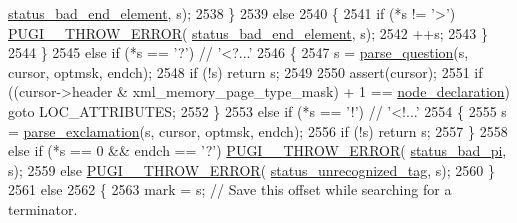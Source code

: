 \begin{DoxyCode}
      \hyperlink{namespacepugi_a9054ca609e12afb8f3e5892fc6c0b555a261cbf22c7da45388bcc1e6759020790}{status\_bad\_end\_element}, s);
2538                         \}
2539                         \textcolor{keywordflow}{else}
2540                         \{
2541                             \textcolor{keywordflow}{if} (*s != \textcolor{charliteral}{'>'}) \hyperlink{pugixml_8cpp_a8af02d87a10272f03f96ab93a96d7202}{PUGI\_\_THROW\_ERROR}(
      \hyperlink{namespacepugi_a9054ca609e12afb8f3e5892fc6c0b555a261cbf22c7da45388bcc1e6759020790}{status\_bad\_end\_element}, s);
2542                             ++s;
2543                         \}
2544                     \}
2545                     \textcolor{keywordflow}{else} \textcolor{keywordflow}{if} (*s == \textcolor{charliteral}{'?'}) \textcolor{comment}{// '<?...'}
2546                     \{
2547                         s = \hyperlink{structxml__parser_a2b0edc4fbf2ff448b4d5b31593c5c4fd}{parse\_question}(s, cursor, optmsk, endch);
2548                         \textcolor{keywordflow}{if} (!s) \textcolor{keywordflow}{return} s;
2549 
2550                         assert(cursor);
2551                         \textcolor{keywordflow}{if} ((cursor->header & xml\_memory\_page\_type\_mask) + 1 == 
      \hyperlink{namespacepugi_a137e94a038e4ab0ada6477cf7f6153a9aad8024cc4a4afbc68c871f3826a00616}{node\_declaration}) \textcolor{keywordflow}{goto} LOC\_ATTRIBUTES;
2552                     \}
2553                     \textcolor{keywordflow}{else} \textcolor{keywordflow}{if} (*s == \textcolor{charliteral}{'!'}) \textcolor{comment}{// '<!...'}
2554                     \{
2555                         s = \hyperlink{structxml__parser_a40da52e4b27a0a06752930a0edf16fe9}{parse\_exclamation}(s, cursor, optmsk, endch);
2556                         \textcolor{keywordflow}{if} (!s) \textcolor{keywordflow}{return} s;
2557                     \}
2558                     \textcolor{keywordflow}{else} \textcolor{keywordflow}{if} (*s == 0 && endch == \textcolor{charliteral}{'?'}) \hyperlink{pugixml_8cpp_a8af02d87a10272f03f96ab93a96d7202}{PUGI\_\_THROW\_ERROR}(
      \hyperlink{namespacepugi_a9054ca609e12afb8f3e5892fc6c0b555ad7a57e8554aabea52ed8b0d6a0891622}{status\_bad\_pi}, s);
2559                     \textcolor{keywordflow}{else} \hyperlink{pugixml_8cpp_a8af02d87a10272f03f96ab93a96d7202}{PUGI\_\_THROW\_ERROR}(
      \hyperlink{namespacepugi_a9054ca609e12afb8f3e5892fc6c0b555a71a555b91e80b6d8f84aeb6a93904d28}{status\_unrecognized\_tag}, s);
2560                 \}
2561                 \textcolor{keywordflow}{else}
2562                 \{
2563                     mark = s; \textcolor{comment}{// Save this offset while searching for a terminator.}

\end{DoxyCode}
